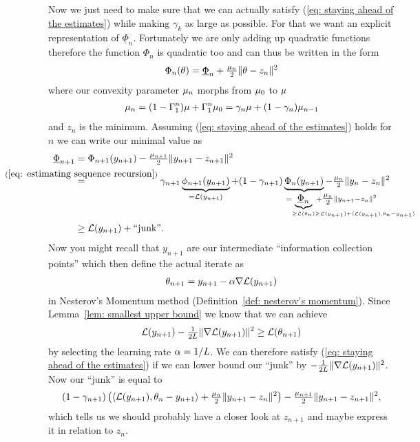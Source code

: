 Now we just need to make sure that we can actually satisfy (\ref{eq: staying
ahead of the estimates}) while making \(\gamma_k\) as large as possible.
For that we want an explicit representation of \(\underline{\Phi}_{n}\).
Fortunately we are only adding up quadratic functions therefore the function
\(\Phi_{n}\) is quadratic too and can thus be written in the form
\begin{align}\label{eq: centered Phi representation}
	\Phi_{n}(\theta) = \underline{\Phi}_{n} + \tfrac{\mu_{n}}{2}\|\theta - z_n\|^2
\end{align}
where our convexity parameter \(\mu_n\) morphs from \(\mu_0\) to
\(\mu\)
\begin{align*}
	\mu_n =(1-\Gamma_1^n)\mu + \Gamma_1^n \mu_0
	= \gamma_n \mu + (1-\gamma_n)\mu_{n-1}
\end{align*}
and \(z_n\) is the minimum. Assuming (\ref{eq: staying ahead of the estimates})
holds for \(n\) we can write our minimal value as
\begin{align*}
	\underline{\Phi}_{n+1}
	&= \Phi_{n+1}(y_{n+1}) - \tfrac{\lbound_{n+1}}{2}\|y_{n+1} - z_{n+1}\|^2 \\
	&\lxeq{(\ref{eq: estimating sequence recursion})}
	\gamma_{n+1} \underbrace{\phi_{n+1}(y_{n+1})}_{
		=\Loss(y_{n+1})
	}
	+ (1-\gamma_{n+1})\underbrace{\Phi_n(y_{n+1})}_{
		= \underbrace{\underline{\Phi}_n}_{
			\ge \Loss(\weights_n)
			\mathrlap{\ge \Loss(y_{n+1}) + \langle \Loss(y_{n+1}), \weights_n - y_{n+1}\rangle}
		} +\mathrlap{\tfrac{\lbound_n}{2}\|y_{n+1} - z_n\|^2}
	} - \tfrac{\lbound_n}{2}\|y_n - z_n\|^2 \\
	&\ge \Loss(y_{n+1}) + \text{``junk''}.
\end{align*}
Now you might recall that \(y_{n+1}\) are our intermediate ``information
collection points'' which then define the actual iterate as
\begin{align*}
	\theta_{n+1} = y_{n+1} - \alpha \nabla\mathcal{L}(y_{n+1})
\end{align*}
in Nesterov's Momentum method (Definition~\ref{def: nesterov's momentum}).
Since Lemma~\ref{lem: smallest upper bound} we know that we can achieve
\begin{align*}
	\mathcal{L}(y_{n+1}) - \tfrac{1}{2L}\|\nabla\mathcal{L}(y_{n+1})\|^2
	\ge \mathcal{L}(\theta_{n+1})
\end{align*}
by selecting the learning rate \(\alpha=1/L\). We can therefore satisfy
(\ref{eq: staying ahead of the estimates}) if we can lower bound our ``junk''
by \( - \tfrac{1}{2L}\|\nabla\mathcal{L}(y_{n+1})\|^2\). Now our ``junk'' is equal to
\begin{align*}
	(1-\gamma_{n+1})\left(
		\langle \mathcal{L}(y_{n+1}), \theta_n - y_{n+1}\rangle
		+ \tfrac{\mu_n}{2}\|y_{n+1} - z_n\|^2
	\right)
	- \tfrac{\mu_{n+1}}{2}\|y_{n+1} - z_{n+1}\|^2,
\end{align*}
which tells us we should probably have a closer look at \(z_{n+1}\) and maybe
express it in relation to \(z_n\).

